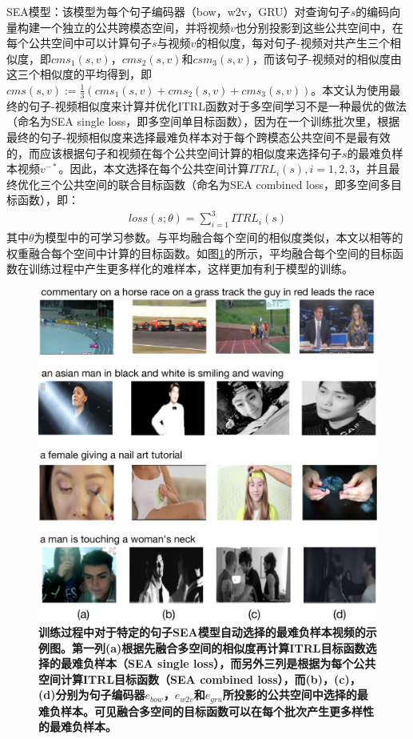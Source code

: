 SEA模型：该模型为每个句子编码器（bow，w2v，GRU）对查询句子$s$的编码向量构建一个独立的公共跨模态空间，并将视频$v$也分别投影到这些公共空间中，在每个公共空间中可以计算句子$s$与视频$v$的相似度，每对句子-视频对共产生三个相似度，即$cms_1(s,v)$，$cms_2(s,v)$和$csm_3(s,v)$，而该句子-视频对的相似度由这三个相似度的平均得到，即$cms(s,v):=\frac{1}{3}(cms_1(s,v)+cms_2(s,v)+cms_3(s,v))$。本文认为使用最终的句子-视频相似度来计算并优化ITRL函数对于多空间学习不是一种最优的做法（命名为SEA single loss，即多空间单目标函数），因为在一个训练批次里，根据最终的句子-视频相似度来选择最难负样本对于每个跨模态公共空间不是最有效的，而应该根据句子和视频在每个公共空间计算的相似度来选择句子$s$的最难负样本视频$v^{-*}$。因此，本文选择在每个公共空间计算$ITRL_i(s), i=1,2,3$，并且最终优化三个公共空间的联合目标函数（命名为SEA combined loss，即多空间多目标函数），即：
\begin{equation}
    \label{eq:loss-sea}
    \begin{aligned}
        loss(s;\theta) = \sum_{i=1}^3 ITRL_i(s)
    \end{aligned}
\end{equation}
其中$\theta$为模型中的可学习参数。与平均融合每个空间的相似度类似，本文以相等的权重融合每个空间中计算的目标函数。如图\ref{fig:negative-examples}的所示，平均融合每个空间的目标函数在训练过程中产生更多样化的难样本，这样更加有利于模型的训练。

\begin{figure}[tbh!]
    \centering
    \includegraphics[width=\linewidth]{figures/single_vs_combined_loss}
    \caption[训练过程中对于特定的句子SEA模型自动选择的最难负样本视频的示例图]{\bfseries{训练过程中对于特定的句子SEA模型自动选择的最难负样本视频的示例图。第一列(a)根据先融合多空间的相似度再计算ITRL目标函数选择的最难负样本（SEA single loss），而另外三列是根据为每个公共空间计算ITRL目标函数（SEA combined loss），而(b)，(c)，(d)分别为句子编码器$e_{bow}$，$e_{w2v}$和$e_{gru}$所投影的公共空间中选择的最难负样本。可见融合多空间的目标函数可以在每个批次产生更多样性的最难负样本。}}
    \label{fig:negative-examples}
\end{figure}


